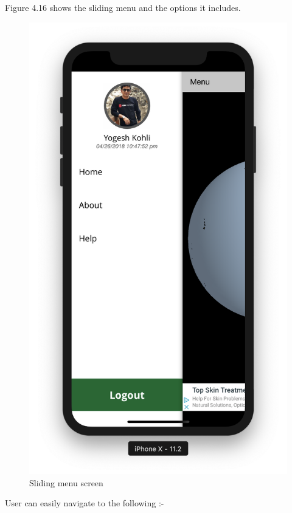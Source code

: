 Figure 4.16 shows the sliding menu and the options it includes.

    \begin{figure}[H]
            \centering
            \includegraphics[width=0.5\linewidth]{figures/ch2/side_menu.png}
            \caption{\label{fig:pass_recovery_1} Sliding menu screen}
    \end{figure}

    User can easily navigate to the following :-

